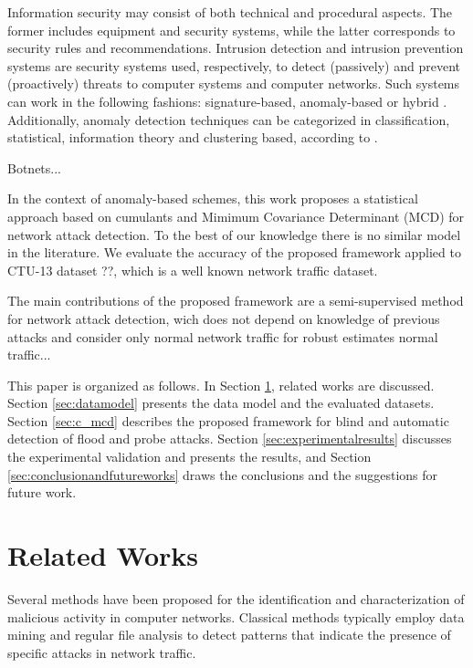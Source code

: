 \documentclass[review]{elsarticle}
\begin{document}
Information security may consist of both technical and procedural aspects. The former includes equipment and security systems, while the latter corresponds to security rules and recommendations. Intrusion detection and intrusion prevention systems are security systems used, respectively, to detect (passively) and prevent (proactively) threats to computer systems and computer networks. Such systems can work in the following fashions: signature-based, anomaly-based or hybrid \cite{Huang2009,mudzingwa2012study}. Additionally, anomaly detection techniques can be categorized in classification, statistical, information theory and clustering based, according to \cite{bhuyan2014network,ahmed2016survey,osanaiye2016distributed}.

Botnets...

In the context of anomaly-based schemes, this work proposes a statistical approach based on cumulants and Mimimum Covariance Determinant (MCD) for network attack detection. To the best of our knowledge there is no similar model in the literature. We evaluate the accuracy of the proposed framework applied to CTU-13 dataset ??, which is a well known network traffic dataset.

The main contributions of the proposed framework are a semi-supervised method for network attack detection, wich does not depend on knowledge of previous attacks and consider only normal network traffic for robust estimates normal traffic...

This paper is organized as follows. In Section \ref{sec:relatedworks}, related works are discussed. Section \ref{sec:datamodel} presents the data model and the evaluated datasets. Section \ref{sec:c_mcd} describes the proposed framework for blind and automatic detection of flood and probe attacks. Section \ref{sec:experimentalresults} discusses the experimental validation and presents the results, and Section \ref{sec:conclusionandfutureworks} draws the conclusions and the suggestions for future work.

\section{Related Works}
\label{sec:relatedworks}

Several methods have been proposed for the identification and characterization of malicious activity in computer networks. Classical methods typically employ data mining \cite{he2008applying,ghourabi2010data,osanaiye2016distributed} and regular file analysis \cite{raynal2004honeypot} to detect patterns that indicate the presence of specific attacks in network traffic.
\end{document}
